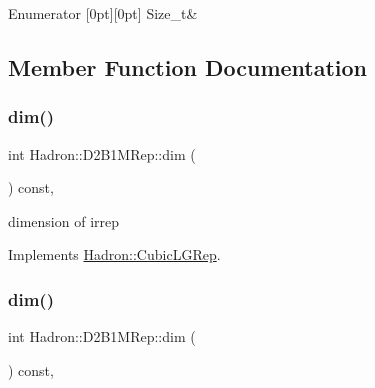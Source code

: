\begin{DoxyEnumFields}{Enumerator}
[0pt][0pt]{}\mbox{\label{structHadron_1_1D2B1MRep_a66c7eff5b43174d71030ed74d021bb01a1939ccd29479d61388485abdfcdc5e5c}} 
Size\+\_\+t&\\
\hline

\end{DoxyEnumFields}


\subsection{Member Function Documentation}
\mbox{\label{structHadron_1_1D2B1MRep_a8d1c9f35b426e8848c73fa423f4f2a4b}} 
\subsubsection{\texorpdfstring{dim()}{dim()}\hspace{0.1cm}{\footnotesize\ttfamily [1/3]}}
{\footnotesize\ttfamily int Hadron\+::\+D2\+B1\+M\+Rep\+::dim (\begin{DoxyParamCaption}{ }\end{DoxyParamCaption}) const\hspace{0.3cm}{\ttfamily [inline]}, {\ttfamily [virtual]}}

dimension of irrep 

Implements \mbox{\hyperlink{structHadron_1_1CubicLGRep_a3acbaea26503ed64f20df693a48e4cdd}{Hadron\+::\+Cubic\+L\+G\+Rep}}.

\mbox{\label{structHadron_1_1D2B1MRep_a8d1c9f35b426e8848c73fa423f4f2a4b}} 
\subsubsection{\texorpdfstring{dim()}{dim()}\hspace{0.1cm}{\footnotesize\ttfamily [2/3]}}
{\footnotesize\ttfamily int Hadron\+::\+D2\+B1\+M\+Rep\+::dim (\begin{DoxyParamCaption}{ }\end{DoxyParamCaption}) const\hspace{0.3cm}{\ttfamily [inline]}, {\ttfamily [virtual]}}

